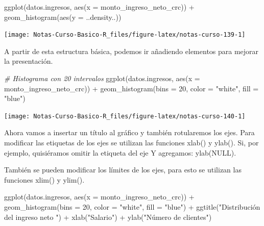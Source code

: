 \documentclass[
  12pt,
]{book}
\newenvironment{Shaded}{\begin{snugshade}}{\end{snugshade}}
\newcommand{\AttributeTok}[1]{\textcolor[rgb]{0.77,0.63,0.00}{#1}}
\newcommand{\CommentTok}[1]{\textcolor[rgb]{0.56,0.35,0.01}{\textit{#1}}}
\newcommand{\DecValTok}[1]{\textcolor[rgb]{0.00,0.00,0.81}{#1}}
\newcommand{\FunctionTok}[1]{\textcolor[rgb]{0.00,0.00,0.00}{#1}}
\newcommand{\NormalTok}[1]{#1}
\newcommand{\SpecialCharTok}[1]{\textcolor[rgb]{0.00,0.00,0.00}{#1}}
\newcommand{\StringTok}[1]{\textcolor[rgb]{0.31,0.60,0.02}{#1}}
\begin{document}
\begin{Shaded}
\begin{Highlighting}[]
\FunctionTok{ggplot}\NormalTok{(datos.ingresos, }\FunctionTok{aes}\NormalTok{(}\AttributeTok{x =}\NormalTok{ monto\_ingreso\_neto\_crc)) }\SpecialCharTok{+}
  \FunctionTok{geom\_histogram}\NormalTok{(}\FunctionTok{aes}\NormalTok{(}\AttributeTok{y =}\NormalTok{ ..density..))}
\end{Highlighting}
\end{Shaded}

\begin{center}\texttt{[image: Notas-Curso-Basico-R\_files/figure-latex/notas-curso-139-1]} \end{center}

A partir de esta estructura básica, podemos ir añadiendo elementos para mejorar la presentación.

\begin{Shaded}
\begin{Highlighting}[]
\CommentTok{\# Histograma con 20 intervalos}
\FunctionTok{ggplot}\NormalTok{(datos.ingresos, }\FunctionTok{aes}\NormalTok{(}\AttributeTok{x =}\NormalTok{ monto\_ingreso\_neto\_crc)) }\SpecialCharTok{+}
  \FunctionTok{geom\_histogram}\NormalTok{(}\AttributeTok{bins =} \DecValTok{20}\NormalTok{, }\AttributeTok{color =} \StringTok{"white"}\NormalTok{, }\AttributeTok{fill =} \StringTok{"blue"}\NormalTok{)}
\end{Highlighting}
\end{Shaded}

\begin{center}\texttt{[image: Notas-Curso-Basico-R\_files/figure-latex/notas-curso-140-1]} \end{center}

Ahora vamos a insertar un título al gráfico y también rotularemos los ejes. Para modificar las etiquetas de los ejes se utilizan las funciones xlab() y ylab(). Si, por ejemplo, quisiéramos omitir la etiqueta del eje Y agregamos: ylab(NULL).

También se pueden modificar los límites de los ejes, para esto se utilizan las funciones xlim() y ylim().

\begin{Shaded}
\begin{Highlighting}[]
\FunctionTok{ggplot}\NormalTok{(datos.ingresos, }\FunctionTok{aes}\NormalTok{(}\AttributeTok{x =}\NormalTok{ monto\_ingreso\_neto\_crc)) }\SpecialCharTok{+}
  \FunctionTok{geom\_histogram}\NormalTok{(}\AttributeTok{bins =} \DecValTok{20}\NormalTok{, }\AttributeTok{color =} \StringTok{"white"}\NormalTok{, }\AttributeTok{fill =} \StringTok{"blue"}\NormalTok{) }\SpecialCharTok{+}
  \FunctionTok{ggtitle}\NormalTok{(}\StringTok{"Distribución del ingreso neto "}\NormalTok{) }\SpecialCharTok{+}
  \FunctionTok{xlab}\NormalTok{(}\StringTok{"Salario"}\NormalTok{) }\SpecialCharTok{+}
  \FunctionTok{ylab}\NormalTok{(}\StringTok{"Número de clientes"}\NormalTok{)}
\end{Highlighting}
\end{Shaded}
\end{document}
